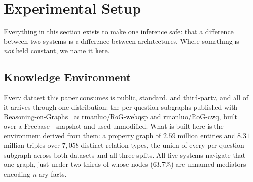 %
%
%
%

\section{Experimental Setup}\label{sec:setup}

Everything in this section exists to make one inference safe: that a
difference between two systems is a difference between architectures.
Where something is \emph{not} held constant, we name it here.

\subsection{Knowledge Environment}\label{sec:environment}

Every dataset this paper consumes is public, standard, and third-party,
and all of it arrives through one distribution: the per-question
subgraphs published with Reasoning-on-Graphs~\cite{luo2024reasoning} as
\textsf{rmanluo/RoG-webqsp} and \textsf{rmanluo/RoG-cwq}, built over a
Freebase~\cite{bollacker2008freebase} snapshot and used unmodified. What
is built here is the environment derived from them: a property graph of
$2.59$ million entities and $8.31$ million triples over $7{,}058$
distinct relation types, the union of every per-question subgraph across
both datasets and all three splits. All five systems navigate that one
graph, just under two-thirds of whose nodes ($63.7\%$) are unnamed
mediators encoding $n$-ary facts.

